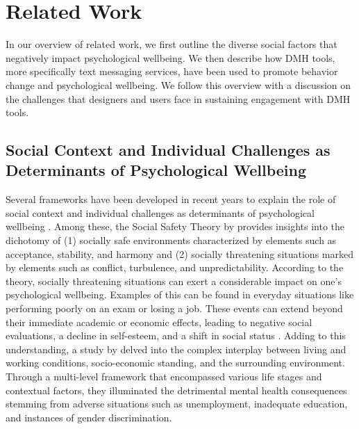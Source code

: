 \section{Related Work}

In our overview of related work, we first outline the diverse social factors that negatively impact psychological wellbeing.
We then describe how DMH tools, more specifically text messaging services, have been used to promote behavior change and psychological wellbeing.
We follow this overview with a discussion on the challenges that designers and users face in sustaining engagement with DMH tools.

\subsection{Social Context and Individual Challenges as Determinants of Psychological Wellbeing}

Several frameworks have been developed in recent years to explain the role of social context and individual challenges as determinants of psychological wellbeing \cite{slavich2020social, slavich2023social, allen2014social, glanz2008health, tachtler2021unaccompanied, oguamanam2023intersectional, sallis2015ecological}. Among these, the Social Safety Theory by \citet{slavich2020social} provides insights into the dichotomy of (1) socially safe environments characterized by elements such as acceptance, stability, and harmony and (2) socially threatening situations marked by elements such as conflict, turbulence, and unpredictability. According to the theory, socially threatening situations can exert a considerable impact on one's psychological wellbeing. Examples of this can be found in everyday situations like performing poorly on an exam or losing a job. These events can extend beyond their immediate academic or economic effects, leading to negative social evaluations, a decline in self-esteem, and a shift in social status \cite{diamond2022rethinking, noronha2018study, bhattacharjee2021understanding, katz2017self}. Adding to this understanding, a study by \citet{allen2014social} delved into the complex interplay between living and working conditions, socio-economic standing, and the surrounding environment. Through a multi-level framework that encompassed various life stages and contextual factors, they illuminated the detrimental mental health consequences stemming from adverse situations such as unemployment, inadequate education, and instances of gender discrimination.


